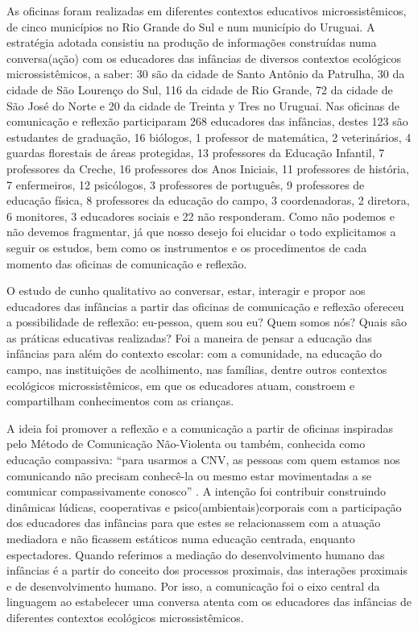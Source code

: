 \documentclass{textolivre-html}
\begin{document}
As oficinas foram realizadas em diferentes contextos educativos microssistêmicos, de cinco municípios no Rio Grande do Sul e num município do Uruguai. A estratégia adotada consistiu na produção de informações construídas numa conversa(ação) com os educadores das infâncias de diversos contextos ecológicos microssistêmicos, a saber: 30 são da cidade de Santo Antônio da Patrulha, 30 da cidade de São Lourenço do Sul, 116 da cidade de Rio Grande, 72 da cidade de São José do Norte e 20 da cidade de Treinta y Tres no Uruguai. Nas oficinas de comunicação e reflexão participaram 268 educadores das infâncias, destes 123 são estudantes de graduação, 16 biólogos, 1 professor de matemática, 2 veterinários, 4 guardas florestais de áreas protegidas, 13 professores da Educação Infantil, 7 professores da Creche, 16 professores dos Anos Iniciais, 11 professores de história, 7 enfermeiros, 12 psicólogos, 3 professores de português, 9 professores de educação física, 8 professores da educação do campo, 3 coordenadoras, 2 diretora, 6 monitores, 3 educadores sociais e 22 não responderam. Como não podemos e não devemos fragmentar, já que nosso desejo foi elucidar o todo explicitamos a seguir os estudos, bem como os instrumentos e os procedimentos de cada momento das oficinas de comunicação e reflexão. 

O estudo de cunho qualitativo ao conversar, estar, interagir e propor aos educadores das infâncias a partir das oficinas de comunicação e reflexão ofereceu a possibilidade de reflexão: eu-pessoa, quem sou eu? Quem somos nós? Quais são as práticas educativas realizadas? Foi a maneira de pensar a educação das infâncias para além do contexto escolar: com a comunidade, na educação do campo, nas instituições de acolhimento, nas famílias, dentre outros contextos ecológicos microssistêmicos, em que os educadores atuam, constroem e compartilham conhecimentos com as crianças. 

A ideia foi promover a reflexão e a comunicação a partir de oficinas inspiradas pelo Método de Comunicação Não-Violenta ou também, conhecida como educação compassiva: “para usarmos a CNV, as pessoas com quem estamos nos comunicando não precisam conhecê-la ou mesmo estar movimentadas a se comunicar compassivamente conosco” \cite[p. 24]{rosenberg2006}. A intenção foi contribuir construindo dinâmicas lúdicas, cooperativas e psico(ambientais)corporais com a participação dos educadores das infâncias para que estes se relacionassem com a atuação mediadora e não ficassem estáticos numa educação centrada, enquanto espectadores. Quando referimos a mediação do desenvolvimento humano das infâncias é a partir do conceito dos processos proximais, das interações proximais e de desenvolvimento humano. Por isso, a comunicação foi o eixo central da linguagem ao estabelecer uma conversa atenta com os educadores das infâncias de diferentes contextos ecológicos microssistêmicos.
\end{document}
